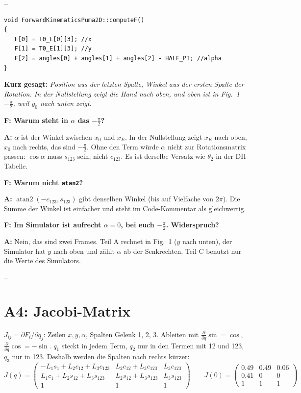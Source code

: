 \documentclass[10pt,a4paper]{article}
\makeatletter
\newcommand{\secneed}[1]{\par\penalty\@M\begingroup\setlength{\dimen@}{#1}\dimen@ii\pagegoal
  \advance\dimen@ii-\pagetotal\ifdim\dimen@>\dimen@ii\ifdim\dimen@ii>\z@\vfil\fi\penalty-\@M\fi\endgroup}
\let\oldsection\section
\renewcommand{\section}{\secneed{9\baselineskip}\oldsection}
\newcommand{\frage}[2]{\textbf{F: #1}\par\nopagebreak\vspace{1pt}\textbf{A:} #2\par\vspace{5pt}}
\newcommand{\sagen}[1]{\textbf{Kurz gesagt:} \emph{#1}\par}
\newcommand{\code}[1]{\texttt{#1}}
\makeatother
\begin{document}
\secneed{7\baselineskip}
\begin{lstlisting}[firstnumber=351]
void ForwardKinematicsPuma2D::computeF()
{
   F[0] = T0_E[0][3]; //x
   F[1] = T0_E[1][3]; //y
   F[2] = angles[0] + angles[1] + angles[2] - HALF_PI; //alpha
}
\end{lstlisting}

\sagen{Position aus der letzten Spalte, Winkel aus der ersten Spalte der Rotation. In der Nullstellung zeigt die Hand nach
oben, und \glqq oben\grqq{} ist in Fig.~1 $-\frac{\pi}{2}$, weil $y_0$ nach unten zeigt.}

\begin{fragen}
\frage{Warum steht in $\alpha$ das $-\frac{\pi}{2}$?}
{$\alpha$ ist der Winkel zwischen $x_0$ und $x_E$. In der Nullstellung zeigt $x_E$ nach oben, $x_0$ nach rechts, das sind
$-\frac{\pi}{2}$. Ohne den Term würde $\alpha$ nicht zur Rotationsmatrix passen: $\cos\alpha$ muss $s_{123}$ sein, nicht
$c_{123}$. Es ist derselbe Versatz wie $\theta_2$ in der DH-Tabelle.}
\frage{Warum nicht \code{atan2}?}
{$\operatorname{atan2}(-c_{123}, s_{123})$ gibt denselben Winkel (bis auf Vielfache von $2\pi$). Die Summe der Winkel ist
einfacher und steht im Code-Kommentar als gleichwertig.}
\frage{Im Simulator ist aufrecht $\alpha = 0$, bei euch $-\frac{\pi}{2}$. Widerspruch?}
{Nein, das sind zwei Frames. Teil A rechnet in Fig.~1 ($y$ nach unten), der Simulator hat $y$ nach oben und zählt $\alpha$ ab
der Senkrechten. Teil C benutzt nur die Werte des Simulators.}
\end{fragen}

\section{A4: Jacobi-Matrix}

$J_{ij} = \partial F_i / \partial q_j$: Zeilen $x, y, \alpha$, Spalten Gelenk 1, 2, 3. Ableiten mit
$\frac{\partial}{\partial q}\sin = \cos$, $\frac{\partial}{\partial q}\cos = -\sin$. $q_1$ steckt in jedem Term, $q_2$ nur
in den Termen mit 12 und 123, $q_3$ nur in 123. Deshalb werden die Spalten nach rechts kürzer:
\[
  \boxed{
  J(q) =
  \begin{pmatrix}
    -L_1 s_1 + L_2 c_{12} + L_3 c_{123} & L_2 c_{12} + L_3 c_{123} & L_3 c_{123} \\
    L_1 c_1 + L_2 s_{12} + L_3 s_{123} & L_2 s_{12} + L_3 s_{123} & L_3 s_{123} \\
    1 & 1 & 1
  \end{pmatrix}}
  \qquad
  J(0) = \begin{pmatrix} 0.49 & 0.49 & 0.06 \\ 0.41 & 0 & 0 \\ 1 & 1 & 1 \end{pmatrix}
\]
\end{document}

